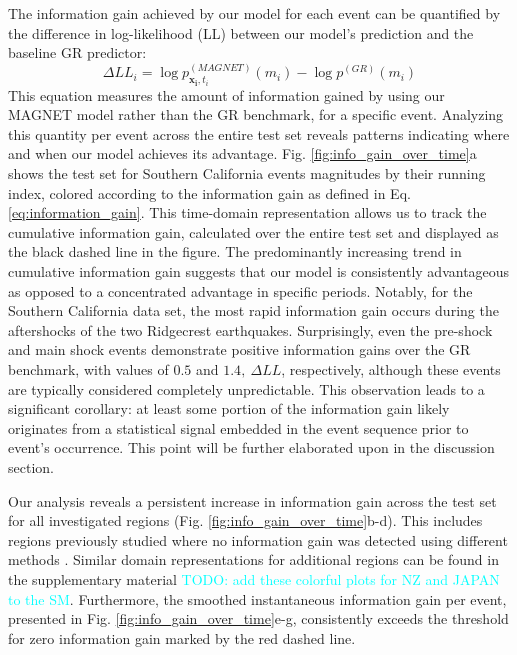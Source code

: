 \documentclass[pdflatex]{sn-jnl}
\newcommand{\neri}[1]{{\textcolor{cyan}{#1}}}
\begin{document}
The information gain achieved by our model for each event can be quantified by the difference in log-likelihood (LL) between our model's prediction and the baseline GR predictor:
\begin{equation}
    \Delta LL_i = \log{p_{\pmb{x_i}, t_i}^{(MAGNET)}(m_i)} - \log{p^{(GR)}(m_i)}
    \label{eq:information_gain}
\end{equation}
This equation measures the amount of information gained by using our MAGNET model rather than the GR benchmark, for a specific event. Analyzing this quantity per event across the entire test set reveals patterns indicating where and when our model achieves its advantage. Fig. \ref{fig:info_gain_over_time}a shows the test set for Southern California events magnitudes by their running index, colored according to the information gain as defined in Eq. \ref{eq:information_gain}. This time-domain representation allows us to track the cumulative information gain, calculated over the entire test set and displayed as the black dashed line in the figure. The predominantly increasing trend in cumulative information gain suggests that our model is consistently advantageous as opposed to a concentrated advantage in specific periods. Notably, for the Southern California data set, the most rapid information gain occurs during the aftershocks of the two Ridgecrest earthquakes. Surprisingly, even the pre-shock and main shock events demonstrate positive information gains over the GR benchmark, with values of $0.5$ and $1.4, \ \Delta LL$, respectively, although these events are typically considered completely unpredictable. This observation leads to a significant corollary: at least some portion of the information gain likely originates from a statistical signal embedded in the event sequence prior to event's occurrence. This point will be further elaborated upon in the discussion section.
\newline

Our analysis reveals a persistent increase in information gain across the test set for all investigated regions (Fig. \ref{fig:info_gain_over_time}b-d). This includes regions previously studied where no information gain was detected using different methods  \cite{ogata_exploring_2018}. Similar domain representations for additional regions can be found in the supplementary material  \neri{TODO: add these colorful plots for NZ and JAPAN to the SM}. Furthermore, the smoothed instantaneous information gain per event, presented in Fig. \ref{fig:info_gain_over_time}e-g, consistently exceeds the threshold for zero information gain marked by the red dashed line.
\end{document}
